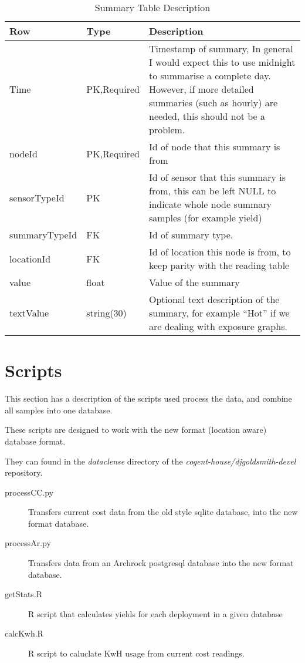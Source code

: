 \documentclass[10pt,a4paper]{article}\usepackage{graphicx, color}
\begin{document}
\begin{table}[htbp]
  \centering
  \begin{tabular}{l l p{6cm}}
    Row           & Type        & Description                                 \\ \hline
    Time          & PK,Required & Timestamp of summary, In general I would expect
  this to use midnight to summarise a complete day. However, if more detailed
  summaries (such as hourly) are needed, this should not be a problem.        \\
    nodeId        & PK,Required & Id of node that this summary is from        \\
    sensorTypeId  & PK          & Id of sensor that this summary is from,  this
  can be left NULL to indicate whole node summary samples (for example yield) \\
    summaryTypeId & FK          & Id of summary type.                         \\
    locationId    & FK          & Id of location this node is from,  to keep
  parity with the reading table                                               \\
    value         & float       & Value of the summary                        \\
    textValue     & string(30)  & Optional text description of the summary, for example ``Hot''
  if we are dealing with exposure graphs.                                     \\
    
  \end{tabular}
  \caption{Summary Table Description}
\end{table}

\section{Scripts}
This section has a description of the scripts used process the data, and combine
all samples into one database.

These scripts are designed to work with the new format (location aware) database format.

They can found in the \emph{dataclense} directory of the \emph{cogent-house/djgoldsmith-devel} repository.

\begin{description}
    \item[processCC.py]  Transfers current cost data from the old style sqlite
      database, into the new format database.
    \item[processAr.py] Transfers data from an Archrock postgresql database into the
      new format database.
    \item[getStats.R] R script that calculates yields for each deployment in a given database
    \item[calcKwh.R] R script to caluclate KwH usage from current cost readings.
\end{description}
\end{document}
